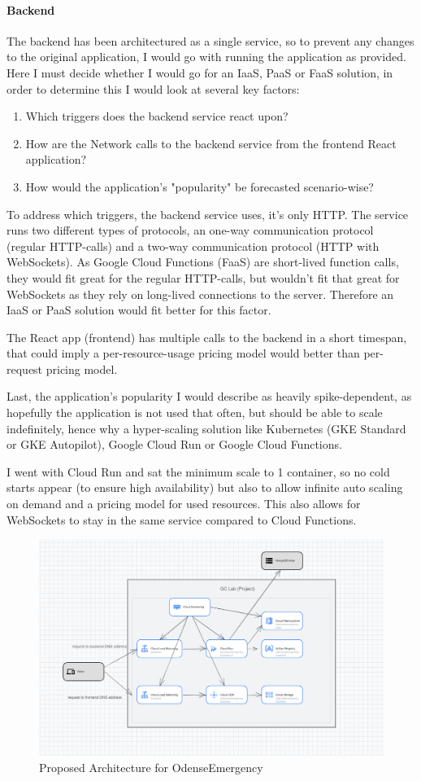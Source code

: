\documentclass[11pt]{article}
\begin{document}
\paragraph{Backend}
The backend has been architectured as a single service, so to prevent any changes to the original application, I would go with running the application as provided. Here I must decide whether I would go for an IaaS, PaaS or FaaS solution, in order to determine this I would look at several key factors:
\begin{enumerate}
	\item Which triggers does the backend service react upon?
	\item How are the Network calls to the backend service from the frontend React application?
	\item How would the application's "popularity" be forecasted scenario-wise?
\end{enumerate}

To address which triggers, the backend service uses, it's only HTTP. The service runs two different types of protocols, an one-way communication protocol (regular HTTP-calls) and a two-way communication protocol (HTTP with WebSockets). As Google Cloud Functions (FaaS) are short-lived function calls, they would fit great for the regular HTTP-calls, but wouldn't fit that great for WebSockets as they rely on long-lived connections to the server. Therefore an IaaS or PaaS solution would fit better for this factor.

The React app (frontend) has multiple calls to the backend in a short timespan, that could imply a per-resource-usage pricing model would better than per-request pricing model.

Last, the application's popularity I would describe as heavily spike-dependent, as hopefully the application is not used that often, but should be able to scale indefinitely, hence why a hyper-scaling solution like Kubernetes (GKE Standard or GKE Autopilot), Google Cloud Run or Google Cloud Functions.

I went with Cloud Run and sat the minimum scale to 1 container, so no cold starts appear (to ensure high availability) but also to allow infinite auto scaling on demand and a pricing model for used resources. This also allows for WebSockets to stay in the same service compared to Cloud Functions.

\begin{figure}[h]
	\centering
	\includegraphics[width=0.7\linewidth]{proposed_architecture}
	\caption{Proposed Architecture for OdenseEmergency}
	\label{fig:proposed_architecture}
\end{figure}
\end{document}
